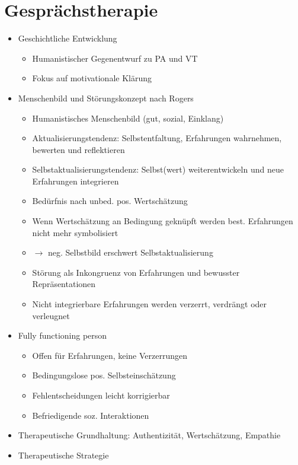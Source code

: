 \documentclass[11pt, paper=a4, twocolumn]{scrartcl}
\begin{document}
	\section{Gesprächstherapie}
		\begin{itemize}
			\item Geschichtliche Entwicklung
				\begin{itemize}
					\item Humanistischer Gegenentwurf zu PA und VT
					\item Fokus auf motivationale Klärung
				\end{itemize}
			\item Menschenbild und Störungskonzept nach Rogers
				\begin{itemize}
					\item Humanistisches Menschenbild (gut, sozial, Einklang)
					\item Aktualisierungstendenz: Selbstentfaltung, Erfahrungen wahrnehmen, bewerten und reflektieren
					\item Selbstaktualisierungstendenz: Selbst(wert) weiterentwickeln und neue Erfahrungen integrieren
					\item Bedürfnis nach unbed. pos. Wertschätzung
					\item Wenn Wertschätzung an Bedingung geknüpft werden best. Erfahrungen nicht mehr symbolisiert
					\item $\rightarrow$ neg. Selbstbild erschwert Selbstaktualisierung
					\item Störung als Inkongruenz von Erfahrungen und bewusster Repräsentationen
					\item Nicht integrierbare Erfahrungen werden verzerrt, verdrängt oder verleugnet
				\end{itemize}
			\item Fully functioning person
				\begin{itemize}
					\item Offen für Erfahrungen, keine Verzerrungen
					\item Bedingungslose pos. Selbsteinschätzung
					\item Fehlentscheidungen leicht korrigierbar
					\item Befriedigende soz. Interaktionen
				\end{itemize}
			\item Therapeutische Grundhaltung: Authentizität, Wertschätzung, Empathie
			\item Therapeutische Strategie
				\begin{itemize}

\end{itemize}
\end{itemize}
\end{document}
